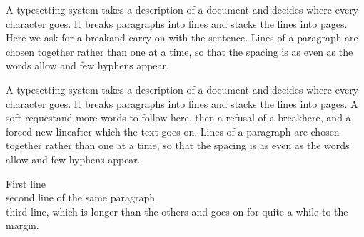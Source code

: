 \documentclass{article}
\begin{document}
A typesetting system takes a description of a document and decides where every character goes. It breaks paragraphs into lines and stacks the lines into pages. Here we ask for a break\linebreak and carry on with the sentence. Lines of a paragraph are chosen together rather than one at a time, so that the spacing is as even as the words allow and few hyphens appear.

A typesetting system takes a description of a document and decides where every character goes. It breaks paragraphs into lines and stacks the lines into pages. A soft request\linebreak[2] and more words to follow here, then a refusal of a break\nolinebreak here, and a forced new line\newline after which the text goes on. Lines of a paragraph are chosen together rather than one at a time, so that the spacing is as even as the words allow and few hyphens appear.

First line\\
second line of the same paragraph\\
third line, which is longer than the others and goes on for quite a while to the margin.
\end{document}
